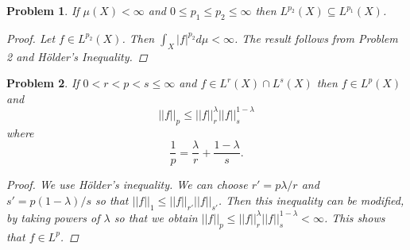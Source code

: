 \documentclass{article}
\newtheorem{problem}{Problem}
\newcommand{\dmu}{d\mu}
\begin{document}
\begin{problem}
If $\mu(X) < \infty$ and $0 \leq p_1 \leq p_2 \leq \infty$ then $L^{p_2}(X) \subseteq L^{p_1}(X)$.
\begin{proof}
Let $f \in L^{p_2} (X)$. Then $\int_X |f|^{p_2} \dmu < \infty$. The result follows from Problem 2 and H\"{o}lder's Inequality.
\end{proof}
\end{problem}

\begin{problem}
If $0 < r < p < s \leq \infty$ and $f \in L^r(X) \cap L^s(X)$ then $f \in L^p(X)$ and
\[
||f||_p \leq ||f||_r^{\lambda} ||f||_s^{1-\lambda}
\]
where
\[
\frac{1}{p} = \frac{\lambda}{r} + \frac{1-\lambda}{s}.
\]
\begin{proof}
We use H\"{o}lder's inequality. We can choose $r' = p\lambda /r$ and $s' = p(1-\lambda)/s$ so that $||f||_1 \leq ||f||_{r'}||f||_{s'}$. Then this inequality can be modified, by taking powers of $\lambda$ so that we obtain $||f||_p \leq ||f||_r^{\lambda} ||f||_s^{1-\lambda} < \infty$. This shows that $f \in L^p$.
\end{proof}
\end{problem}
\end{document}
